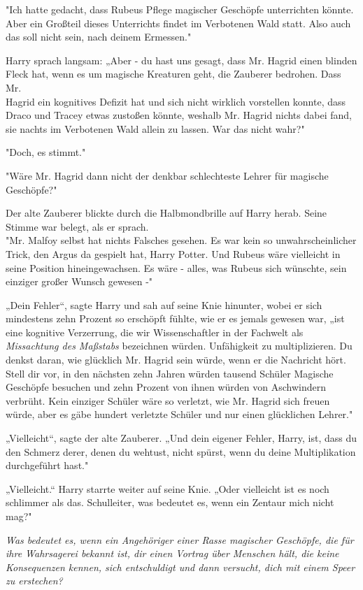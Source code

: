 {"Ich hatte gedacht, dass Rubeus Pflege magischer Geschöpfe unterrichten könnte.\\ Aber ein Großteil dieses Unterrichts findet im Verbotenen Wald statt. Also auch das soll nicht sein, nach deinem Ermessen."

Harry sprach langsam: „Aber - du hast uns gesagt, dass Mr. Hagrid einen blinden Fleck hat, wenn es um magische Kreaturen geht, die Zauberer bedrohen. Dass Mr.\\ Hagrid ein kognitives Defizit hat und sich nicht wirklich vorstellen konnte, dass Draco und Tracey etwas zustoßen könnte, weshalb Mr. Hagrid nichts dabei fand, sie nachts im Verbotenen Wald allein zu lassen. War das nicht wahr?"

"Doch, es stimmt."

"Wäre Mr. Hagrid dann nicht der denkbar schlechteste Lehrer für magische Geschöpfe?"

Der alte Zauberer blickte durch die Halbmondbrille auf Harry herab. Seine Stimme war belegt, als er sprach.\\ "Mr. Malfoy selbst hat nichts Falsches gesehen. Es war kein so unwahrscheinlicher Trick, den Argus da gespielt hat, Harry Potter. Und Rubeus wäre vielleicht in seine Position hineingewachsen. Es wäre - alles, was Rubeus sich wünschte, sein einziger großer Wunsch gewesen -"

„Dein Fehler“, sagte Harry und sah auf seine Knie hinunter, wobei er sich mindestens zehn Prozent so erschöpft fühlte, wie er es jemals gewesen war, „ist eine kognitive Verzerrung, die wir Wissenschaftler in der Fachwelt als \emph{Missachtung des Maßstabs} bezeichnen würden. Unfähigkeit zu multiplizieren. Du denkst daran, wie glücklich Mr. Hagrid sein würde, wenn er die Nachricht hört. Stell dir vor, in den nächsten zehn Jahren würden tausend Schüler Magische Geschöpfe besuchen und zehn Prozent von ihnen würden von Aschwindern verbrüht. Kein einziger Schüler wäre so verletzt, wie Mr. Hagrid sich freuen würde, aber es gäbe hundert verletzte Schüler und nur einen glücklichen Lehrer."

„Vielleicht“, sagte der alte Zauberer. „Und dein eigener Fehler, Harry, ist, dass du den Schmerz derer, denen du wehtust, nicht spürst, wenn du deine Multiplikation durchgeführt hast."

„Vielleicht.“ Harry starrte weiter auf seine Knie. „Oder vielleicht ist es noch schlimmer als das. Schulleiter, was bedeutet es, wenn ein Zentaur mich nicht mag?"

\emph{Was bedeutet es, wenn ein Angehöriger einer Rasse magischer Geschöpfe, die für ihre Wahrsagerei bekannt ist, dir einen Vortrag über Menschen hält, die keine Konsequenzen kennen, sich entschuldigt und dann versucht, dich mit einem Speer zu erstechen?}

}
